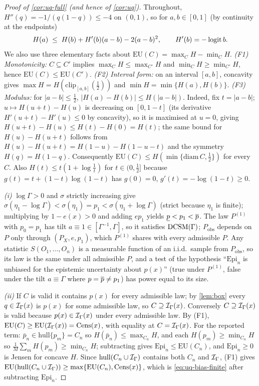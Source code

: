 \begin{proof}[Proof of \cref{cor:uq-full} (and hence of \cref{cor:uq})]
Throughout, $H''(q)=-1/(q(1-q))\le-4$ on $(0,1)$, so for $a,b\in[0,1]$ (by continuity at the
endpoints)
\begin{equation}
  H(a)\;\le\;H(b)+H'(b)(a-b)-2(a-b)^2,\qquad H'(b)=-\operatorname{logit} b .
  \label{eq:sc}
\end{equation}
We also use three elementary facts about $\mathrm{EU}(C)=\max_C H-\min_C H$.
\emph{(F1) Monotonicity:} $C\subseteq C'$ implies $\max_C H\le\max_{C'}H$ and
$\min_C H\ge\min_{C'}H$, hence $\mathrm{EU}(C)\le\mathrm{EU}(C')$.
\emph{(F2) Interval form:} on an interval $[a,b]$, concavity gives
$\max H=H(\mathrm{clip}_{[a,b]}(\tfrac12))$ and $\min H=\min\{H(a),H(b)\}$.
\emph{(F3) Modulus:} for $|a-b|\le\tfrac12$, $|H(a)-H(b)|\le H(|a-b|)$. Indeed, fix
$t=|a-b|$; $u\mapsto H(u+t)-H(u)$ is decreasing on $[0,1-t]$ (its derivative
$H'(u+t)-H'(u)\le0$ by concavity), so it is maximised at $u=0$, giving
$H(u+t)-H(u)\le H(t)-H(0)=H(t)$; the same bound for $H(u)-H(u+t)$ follows from
$H(u)-H(u+t)=H(1-u)-H(1-u-t)$ and the symmetry $H(q)=H(1-q)$. Consequently
$\mathrm{EU}(C)\le H(\min\{\mathrm{diam}\,C,\tfrac12\})$ for every $C$. Also
$H(t)\le t(1+\log\tfrac1t)$ for $t\in(0,\tfrac12]$ because
$g(t)=t+(1-t)\log(1-t)$ has $g(0)=0$, $g'(t)=-\log(1-t)\ge0$.

\emph{(i)} $\log\Gamma>0$ and $\sigma$ strictly increasing give
$\sigma(\eta_1-\log\Gamma)<\sigma(\eta_1)=p_1<\sigma(\eta_1+\log\Gamma)$ (strict because
$\eta_1$ is finite); multiplying by $1-e(x)>0$ and adding $e p_1$ yields
$\underline{p}<p_1<\overline{p}$. The law $P^{(1)}$ with $p_0=p_1$ has tilt $a\equiv1\in[\Gamma^{-1},\Gamma]$,
so it satisfies $\textup{DCSM}(\Gamma)$; $P_{\mathrm{obs}}$ depends on $P$ only through
$(P_X,e,p_1)$, which $P^{(1)}$ shares with every admissible $P$. Any statistic
$S(O_1,\dots,O_n)$ is a measurable function of an i.i.d.\ sample from
$P_{\mathrm{obs}}$, so its law is the same under all admissible $P$, and a test of the
hypothesis ``$\mathrm{Epi}_n$ is unbiased for the epistemic uncertainty about $p(x)$''
(true under $P^{(1)}$, false under the tilt $a\equiv\Gamma$ where $p=\overline{p}\ne p_1$) has
power equal to its size.

\emph{(ii)} If $C$ is valid it contains $p(x)$ for every admissible law; by
\cref{lem:box} every $q\in\mathcal{I}_\Gamma(x)$ is $p(x)$ for some admissible law, so
$C\supseteq\mathcal{I}_\Gamma(x)$. Conversely $C\supseteq\mathcal{I}_\Gamma(x)$ is valid because
$p(x)\in\mathcal{I}_\Gamma(x)$ under every admissible law. By (F1),
$\mathrm{EU}(C)\ge\mathrm{EU}(\mathcal{I}_\Gamma(x))=\mathrm{Cens}(x)$, with equality at
$C=\mathcal{I}_\Gamma(x)$. For the reported term: $\bar p_n\in\mathrm{hull}\{p_m\}=C_n$ so
$H(\bar p_n)\le\max_{C_n}H$, and each $H(p_m)\ge\min_{C_n}H$ so
$\tfrac1M\sum_mH(p_m)\ge\min_{C_n}H$; subtracting gives
$\mathrm{Epi}_n\le\mathrm{EU}(C_n)$, and $\mathrm{Epi}_n\ge0$ is Jensen for concave $H$.
Since $\mathrm{hull}(C_n\cup\mathcal{I}_\Gamma)$ contains both $C_n$ and $\mathcal{I}_\Gamma$, (F1) gives
$\mathrm{EU}(\mathrm{hull}(C_n\cup\mathcal{I}_\Gamma))\ge\max\{\mathrm{EU}(C_n),\mathrm{Cens}(x)\}$,
which is \eqref{eq:uq-bias-finite} after subtracting $\mathrm{Epi}_n$.


\end{proof}
